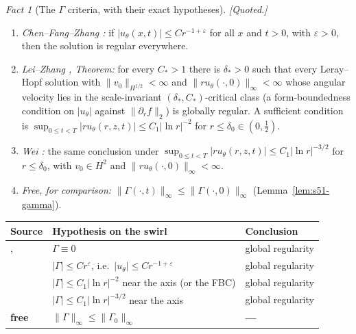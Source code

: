 \documentclass[11pt]{article}
\theoremstyle{definition}
\theoremstyle{remark}
\newtheorem{fact}[theorem]{Fact}
\newcommand{\eps}{\varepsilon}
\begin{document}
\begin{fact}[The $\Gamma$ criteria, with their exact hypotheses]
  \label{fact:s51-gamma-criteria}
  \emph{[Quoted.]}
  \begin{enumerate}[label=\textup{(\alph*)},leftmargin=2.4em]
  \item \emph{Chen--Fang--Zhang \cite{ChenFangZhang2017}:} if
    $|u_\theta(x,t)|\leq Cr^{-1+\eps}$ for all $x$ and $t>0$, with
    $\eps>0$, then the solution is regular everywhere.
  \item \emph{Lei--Zhang \cite{LeiZhang2017}, Theorem:} for every $C_*>1$
    there is $\delta_*>0$ such that every Leray--Hopf solution with
    $\|v_0\|_{H^{1/2}}<\infty$ and $\|ru_\theta(\cdot,0)\|_\infty<\infty$
    whose angular velocity lies in the scale-invariant
    $(\delta_*,C_*)$-critical class (a form-boundedness condition on
    $|u_\theta|$ against $\|\partial_rf\|_2$) is globally regular. A
    sufficient condition is
    $\sup_{0\leq t<T}|r u_\theta(r,z,t)|\leq C_1|\ln r|^{-2}$ for
    $r\leq\delta_0\in(0,\tfrac12)$.
  \item \emph{Wei \cite{Wei2016}:} the same conclusion under
    $\sup_{0\leq t<T}|ru_\theta(r,z,t)|\leq C_1|\ln r|^{-3/2}$ for
    $r\leq\delta_0$, with $v_0\in H^2$ and $\|ru_\theta(\cdot,0)\|_\infty<\infty$.
  \item \emph{Free, for comparison:} $\|\Gamma(\cdot,t)\|_\infty\leq
    \|\Gamma(\cdot,0)\|_\infty$ (Lemma~\ref{lem:s51-gamma}).
  \end{enumerate}
\end{fact}

\begin{center}
\small
\begin{tabular}{@{}l p{} l@{}}
\toprule
Source & Hypothesis on the swirl & Conclusion \\
\midrule
\cite{Ladyzhenskaya1968},\cite{UkhovskiiYudovich1968}
  & $\Gamma\equiv0$ & global regularity \\
\cite{ChenFangZhang2017}
  & $|\Gamma|\leq Cr^{\eps}$, i.e.\ $|u_\theta|\leq Cr^{-1+\eps}$
  & global regularity \\
\cite{LeiZhang2017}
  & $|\Gamma|\leq C_1|\ln r|^{-2}$ near the axis (or the FBC)
  & global regularity \\
\cite{Wei2016}
  & $|\Gamma|\leq C_1|\ln r|^{-3/2}$ near the axis
  & global regularity \\
\midrule
\textbf{free} & $\|\Gamma\|_\infty\leq\|\Gamma_0\|_\infty$
  & \textbf{---} \\
\bottomrule
\end{tabular}
\end{center}
\end{document}
